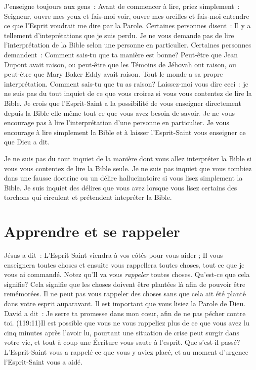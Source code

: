 J'enseigne toujours aux gens~:
 \og Avant de commencer à lire, priez simplement~:
 \og Seigneur, ouvre mes yeux et fais-moi voir,
 ouvre mes oreilles et fais-moi entendre ce que l'Esprit
 voudrait me dire par la Parole. \fg{}
 Certaines personnes disent~:
 \og Il y a tellement d'inteprétations que je suis perdu. \fg{}
 Je ne vous demande pas de lire l'interprétation de la Bible
 selon une personne en particulier.
 Certaines personnes demandent~:
 \og Comment sais-tu que ta manière est bonne? Peut-être que Jean Dupont
 avait raison, ou peut-être que les Témoins de Jéhovah ont raison,
 ou peut-être que Mary Baker Eddy avait raison.
 Tout le monde a sa propre interprétation.
 Comment sais-tu que tu as raison? \fg{}
 Laissez-moi vous dire ceci~: je ne suis pas du tout inquiet
 de ce que vous croirez si vous vous contentez de lire la Bible.
 Je crois que l'Esprit-Saint a la possibilité de vous enseigner
 \ocadr directement depuis la Bible elle-même \fcadr{}
 tout ce que vous avez besoin de savoir.
 Je ne vous encourage pas à lire l'interprétation d'une personne
 en particulier. Je vous encourage à lire simplement la Bible
 et à laisser l'Esprit-Saint vous enseigner ce que Dieu a dit.

Je ne suis pas du tout inquiet de la manière dont vous allez interpréter
 la Bible si vous vous contentez de lire la Bible seule.
 Je ne suis pas inquiet que vous tombiez dans une fausse doctrine
 ou un délire hallucinatoire si vous lisez simplement la Bible.
 Je suis inquiet des délires que vous avez lorsque vous lisez certains
 des torchons qui circulent et prétendent intepréter la Bible.


\section*{Apprendre et se rappeler}

Jésus a dit~: \og L'Esprit-Saint viendra à vos côtés pour vous aider ;
 Il vous enseignera toutes choses et ensuite vous rappellera toutes choses,
 tout ce que je vous ai commandé. \fg{}
 Notez qu'Il va vous \emph{rappeler} toutes choses.
 Qu'est-ce que cela signifie? Cela signifie que les choses
 doivent être plantées là afin de pouvoir être remémorées.
 Il ne peut pas vous rappeler des choses sans que cela ait été planté
 dans votre esprit auparavant. Il est important que vous lisiez
 la Parole de Dieu. David a dit~: \og Je serre ta promesse dans mon cœur,
 afin de ne pas pécher contre toi. \fg{}
 (119:11)Il est possible que vous ne vous rappeliez
 plus de ce que vous avez lu
 cinq minutes après l'avoir lu, pourtant une situation de crise
 peut surgir dans votre vie, et tout à coup une Écriture vous saute
 à l'esprit. Que s'est-il passé? L'Esprit-Saint vous a rappelé
 ce que vous y aviez placé, et au moment d'urgence l'Esprit-Saint
 vous a aidé.

